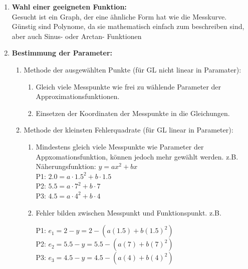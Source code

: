      	\begin{enumerate}
     	\item \textbf{Wahl einer geeigneten Funktion:}\\
     	Gesucht ist ein Graph, der eine ähnliche Form
		hat wie die Messkurve. Günstig sind Polynome, da sie mathematisch einfach zum
		beschreiben sind, aber auch Sinus- oder Arctan- Funktionen	\\ 
     	
        \item \textbf{Bestimmung der Parameter:}
          \begin{enumerate}
           \item Methode der ausgewählten Punkte (für GL nicht linear in Paramater):\\
          		\begin{enumerate}
                    \item Gleich viele Messpunkte wie frei zu wählende Parameter der
           			Approximationsfunktionen.
           			\item Einsetzen der Koordinaten der Messpunkte in die Gleichungen.
           		\end{enumerate}
           	\item Methode der kleinsten Fehlerquadrate (für GL linear in Parameter):
           		\begin{enumerate}
                     \item Mindestens gleich viele Messpunkte wie Parameter der
           		Appxomationsfunktion, können jedoch mehr gewählt werden. z.B. \\
						Näherungsfunktion: $y = ax^2 + bx$ \\
						P1:		$2.0 = a\cdot 1.5^2+b\cdot 1.5$ \\
						P2: 	$5.5 = a\cdot 7^2+b\cdot 7$\\
						P3: 	$4.5 = a\cdot 4^2+b\cdot 4$         		
           		\item Fehler bilden zwischen Messpunkt und Funktionspunkt. z.B.\\
           		\begin{minipage}{10cm}
           				P1:  	$e_1=2-y=2-(a(1.5)+b(1.5)^2)$\\
           				P2:  	$e_2=5.5-y=5.5-(a(7)+b(7)^2)$\\
           				P3:  	$e_3=4.5-y=4.5-(a(4)+b(4)^2)$\\
           		\end{minipage}
				\begin{minipage}{6cm}

\end{minipage}
\end{enumerate}
\end{enumerate}
\end{enumerate}
